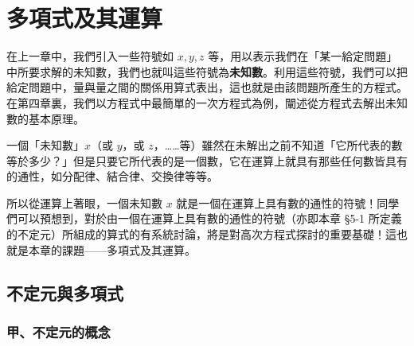 
\section{多項式及其運算}\label{sec:ch5}

在上一章中，我們引入一些符號如 $x, y, z$ 等，用以表示我們在「某一給定問題」中所要求解的未知數，我們也就叫這些符號為\textbf{未知數}。利用這些符號，我們可以把給定問題中，量與量之間的關係用算式表出，這也就是由該問題所產生的方程式。在第四章裏，我們以方程式中最簡單的一次方程式為例，闡述從方程式去解出未知數的基本原理。

一個「未知數」$x$（或 $y$，或 $z$，……等）雖然在未解出之前不知道「它所代表的數等於多少？」但是只要它所代表的是一個數，它在運算上就具有那些任何數皆具有的通性，如分配律、結合律、交換律等等。

所以從運算上著眼，一個未知數 $x$ 就是一個在運算上具有數的通性的符號！同學們可以預想到，對於由一個在運算上具有數的通性的符號（亦即本章 \S 5-1 所定義的不定元）所組成的算式的有系統討論，將是對高次方程式探討的重要基礎！這也就是本章的課題——多項式及其運算。

\subsection{不定元與多項式}\label{sec:5-1}

\subsubsection*{甲、不定元的概念}\label{subsec:5-1-a}

